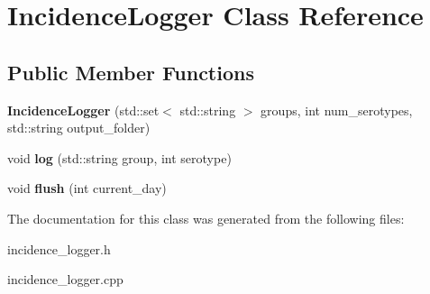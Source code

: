 \hypertarget{class_incidence_logger}{}\section{Incidence\+Logger Class Reference}
\label{class_incidence_logger}
\subsection*{Public Member Functions}
\begin{DoxyCompactItemize}
\item 
\mbox{\label{class_incidence_logger_aa68253999e90e69414bbf3e3f3fb984f}} 
{\bfseries Incidence\+Logger} (std\+::set$<$ std\+::string $>$ groups, int num\+\_\+serotypes, std\+::string output\+\_\+folder)
\item 
\mbox{\label{class_incidence_logger_adbb602cdf14e218c32b3feea4beb624f}} 
void {\bfseries log} (std\+::string group, int serotype)
\item 
\mbox{\label{class_incidence_logger_a4e76d406efe4cb59b41e20d9af1edca2}} 
void {\bfseries flush} (int current\+\_\+day)
\end{DoxyCompactItemize}


The documentation for this class was generated from the following files\+:\begin{DoxyCompactItemize}
\item 
incidence\+\_\+logger.\+h\item 
incidence\+\_\+logger.\+cpp\end{DoxyCompactItemize}

